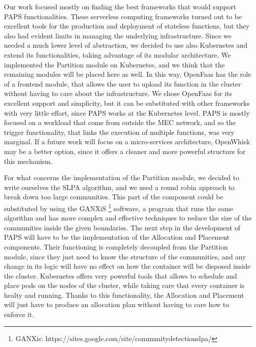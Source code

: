Our work focused mostly on finding the best frameworks that would support PAPS functionalities.
These serverless computing frameworks turned out to be excellent tools for the production
and deployment of stateless functions, but they also had evident limits in managing the underlying
infrastructure.
Since we needed a much lower level of abstraction, we decided to use also Kubernetes and extend
its functionalities, taking advantage of its modular architecture.
We implemented the Partition module on Kubernetes, and we think that the remaining modules will
be placed here as well. In this way, OpenFaas has the role of a frontend module, that allows
the user to upload its function in the cluster without having to care about the infrastructure.
We chose OpenFaas for its excellent support and simplicity, but it can be substituted with other frameworks
with very little effort, since PAPS works at the Kubernetes level.
PAPS is mostly focused on a workload that come from outside the MEC network, and so the trigger functionality,
that links the execution of multiple functions, was very marginal.
If a future work will focus on a micro-services architecture, OpenWhisk may be
a better option, since it offers a cleaner and more powerful structure for this mechanism.
\par
For what concerns the implementation of the Partition module, we decided to write ourselves 
the SLPA algorithm, and we used a round robin approach to break down too large communities.
This part of the component could be substituted by using the GANXiS \footnote{GANXis: https://sites.google.com/site/communitydetectionslpa/} software, a program
that runs the same algorithm and has more complex and effective techniques to reduce
the size of the communities inside the given boundaries.
The next step in the development of PAPS will have to be the implementation of the Allocation 
and Placement components. Their functioning is completely decoupled from the Partition module,
since they just need to know the structure of the communities, and any change in its logic
will have no effect on how the container will be disposed inside the cluster.
Kubernetes offers very powerful tools that allows to schedule and place pods on the nodes of the cluster,
while taking care that every container is healty and running. Thanks to this functionality,
the Allocation and Placement will just have to produce an allocation plan without having to
care how to enforce it.